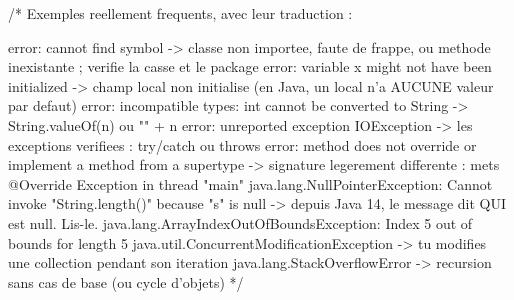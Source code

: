 \documentclass[12pt,a4paper,twoside,openright]{book}
\begin{document}
\begin{codejava}
/*
  Exemples reellement frequents, avec leur traduction :

  error: cannot find symbol                -> classe non importee, faute de frappe, ou methode
                                             inexistante ; verifie la casse et le package
  error: variable x might not have been initialized -> champ local non initialise (en Java, un
                                             local n'a AUCUNE valeur par defaut)
  error: incompatible types: int cannot be converted to String -> String.valueOf(n) ou "" + n
  error: unreported exception IOException  -> les exceptions verifiees : try/catch ou throws
  error: method does not override or implement a method from a supertype
                                          -> signature legerement differente : mets @Override
  Exception in thread "main" java.lang.NullPointerException: Cannot invoke "String.length()"
       because "s" is null                 -> depuis Java 14, le message dit QUI est null. Lis-le.
  java.lang.ArrayIndexOutOfBoundsException: Index 5 out of bounds for length 5
  java.util.ConcurrentModificationException -> tu modifies une collection pendant son iteration
  java.lang.StackOverflowError              -> recursion sans cas de base (ou cycle d'objets)
*/
\end{codejava}
\end{document}
